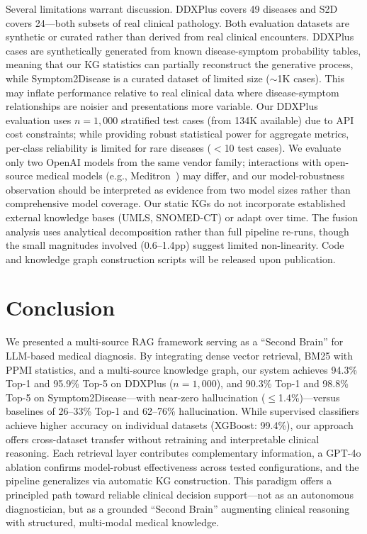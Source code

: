 \documentclass[runningheads]{llncs}
\begin{document}
Several limitations warrant discussion. DDXPlus covers 49 diseases and S2D covers 24---both subsets of real clinical pathology. Both evaluation datasets are synthetic or curated rather than derived from real clinical encounters. DDXPlus cases are synthetically generated from known disease-symptom probability tables, meaning that our KG statistics can partially reconstruct the generative process, while Symptom2Disease is a curated dataset of limited size (${\sim}$1K cases). This may inflate performance relative to real clinical data where disease-symptom relationships are noisier and presentations more variable. Our DDXPlus evaluation uses $n{=}1{,}000$ stratified test cases (from 134K available) due to API cost constraints; while providing robust statistical power for aggregate metrics, per-class reliability is limited for rare diseases ($<$10 test cases). We evaluate only two OpenAI models from the same vendor family; interactions with open-source medical models (e.g., Meditron~\cite{chen2023meditron}) may differ, and our model-robustness observation should be interpreted as evidence from two model sizes rather than comprehensive model coverage. Our static KGs do not incorporate established external knowledge bases (UMLS, SNOMED-CT) or adapt over time. The fusion analysis uses analytical decomposition rather than full pipeline re-runs, though the small magnitudes involved (0.6--1.4pp) suggest limited non-linearity. Code and knowledge graph construction scripts will be released upon publication.

\section{Conclusion}
\label{sec:conclusion}

We presented a multi-source RAG framework serving as a ``Second Brain'' for LLM-based medical diagnosis. By integrating dense vector retrieval, BM25 with PPMI statistics, and a multi-source knowledge graph, our system achieves 94.3\% Top-1 and 95.9\% Top-5 on DDXPlus ($n{=}1{,}000$), and 90.3\% Top-1 and 98.8\% Top-5 on Symptom2Disease---with near-zero hallucination ($\leq$1.4\%)---versus baselines of 26--33\% Top-1 and 62--76\% hallucination. While supervised classifiers achieve higher accuracy on individual datasets (XGBoost: 99.4\%), our approach offers cross-dataset transfer without retraining and interpretable clinical reasoning. Each retrieval layer contributes complementary information, a GPT-4o ablation confirms model-robust effectiveness across tested configurations, and the pipeline generalizes via automatic KG construction. This paradigm offers a principled path toward reliable clinical decision support---not as an autonomous diagnostician, but as a grounded ``Second Brain'' augmenting clinical reasoning with structured, multi-modal medical knowledge.
\end{document}
